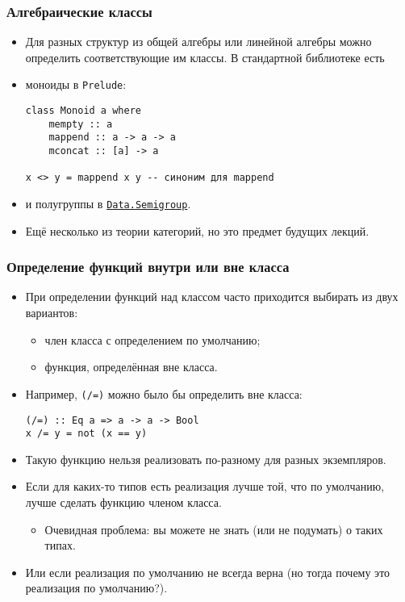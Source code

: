 \documentclass[10pt]{beamer}
\begin{document}
\begin{frame}[fragile]
  \frametitle{Алгебраические классы}
  \begin{itemize}
    \item Для разных структур из общей алгебры или линейной алгебры можно определить соответствующие им классы. В стандартной библиотеке есть
    \item моноиды в \lstinline|Prelude|:
          \begin{lstlisting}
class Monoid a where
    mempty :: a
    mappend :: a -> a -> a
    mconcat :: [a] -> a
    
x <> y = mappend x y -- синоним для mappend
\end{lstlisting}
    \item и полугруппы в \href{https://hackage.haskell.org/package/base-4.10.1.0/docs/Data-Semigroup.html}{\lstinline|Data.Semigroup|}. \pause
    \item Ещё несколько из теории категорий, но это предмет будущих лекций.
  \end{itemize}
\end{frame}

\begin{frame}[fragile]
  \frametitle{Определение функций внутри или вне класса}
  \begin{itemize}
    \item При определении функций над классом часто приходится выбирать из двух вариантов:
          \begin{itemize}
            \item член класса с определением по умолчанию;
            \item функция, определённая вне класса.
          \end{itemize}
    \item Например, \lstinline|(/=)| можно было бы определить вне класса:
          \begin{lstlisting}
(/=) :: Eq a => a -> a -> Bool
x /= y = not (x == y)
\end{lstlisting}\pause
    \item Такую функцию нельзя реализовать по-разному для разных экземпляров.\pause
    \item Если для каких-то типов есть реализация лучше той, что по умолчанию, лучше сделать функцию членом класса.
          \pause
          \begin{itemize}
            \item Очевидная проблема: вы можете не знать (или не подумать) о таких типах.
          \end{itemize}
          \pause
    \item Или если реализация по умолчанию не всегда верна \pause(но тогда почему это реализация по умолчанию?).
  \end{itemize}
\end{frame}
\end{document}
